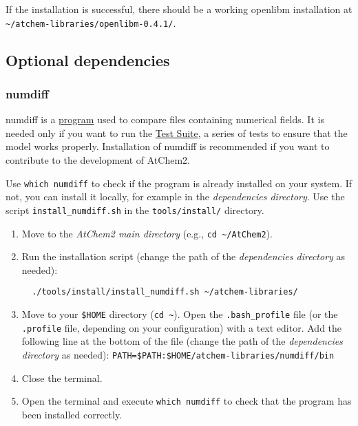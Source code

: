 If the installation is successful, there should be a working openlibm
installation at
\texttt{\textasciitilde{}/atchem-libraries/openlibm-0.4.1/}.

\subsection{Optional
  dependencies} \label{subsec:optional-dependencies}

\subsubsection{numdiff} \label{numdiff}

numdiff is a \href{https://www.nongnu.org/numdiff/}{program} used to
compare files containing numerical fields. It is needed only if you
want to run the \hyperref[sec:testsuite]{Test Suite}, a series of
tests to ensure that the model works properly. Installation of numdiff
is recommended if you want to contribute to the development of
AtChem2.

Use \texttt{which\ numdiff} to check if the program is already
installed on your system. If not, you can install it locally, for
example in the \emph{dependencies directory}. Use the script
\texttt{install\_numdiff.sh} in the \texttt{tools/install/} directory.

\begin{enumerate}
\item Move to the \emph{AtChem2 main directory} (e.g., \texttt{cd\
    \textasciitilde{}/AtChem2}).
\item Run the installation script (change the path of the
  \emph{dependencies directory} as needed):
  \begin{verbatim}
  ./tools/install/install_numdiff.sh ~/atchem-libraries/
\end{verbatim}
\item Move to your \texttt{\$HOME} directory (\texttt{cd\
    \textasciitilde{}}). Open the \texttt{.bash\_profile} file (or the
  \texttt{.profile} file, depending on your configuration) with a text
  editor. Add the following line at the bottom of the file (change the
  path of the \emph{dependencies directory} as needed):
  \texttt{PATH=\$PATH:\$HOME/atchem-libraries/numdiff/bin}
\item Close the terminal.
\item Open the terminal and execute \texttt{which\ numdiff} to check
  that the program has been installed correctly.
\end{enumerate}

